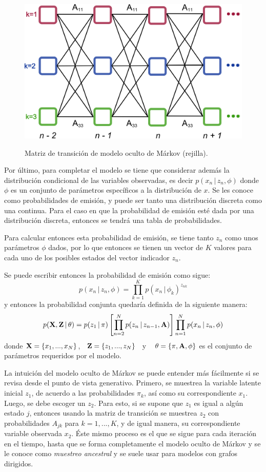 \begin{figure}[hbt]
        \myfloatalign
        {\includegraphics[width=0.63\linewidth]{gfx/chap2/mod-hmm3}}
        \caption{Matriz de transición de modelo oculto de Márkov (rejilla).}
        \label{fig:mod_hmm3}
\end{figure}

Por último, para completar el modelo se tiene que considerar además la distribución condicional de las variables observadas, es decir $p(x_n \,|\, z_n, \phi)$ donde $\phi$ es un conjunto de parámetros específicos a la distribución de $x$. Se les conoce como probabilidades de emisión, y puede ser tanto una distribución discreta como una continua. Para el caso en que la probabilidad de emisión esté dada por una distribución discreta, entonces se tendrá una tabla de probabilidades.

Para calcular entonces esta probabilidad de emisión, se tiene tanto $z_n$ como unos parámetros $\phi$ dados, por lo que entonces se tienen un vector de $K$ valores para cada uno de los posibles estados del vector indicador $z_n$.

Se puede escribir entonces la probabilidad de emisión como sigue:
\begin{equation}
p(x_n \,|\, z_n, \phi) = \prod_{k=1}^K p(x_n \,|\, \phi_k) ^ {z_{nk}}
\label{eqn:2-10}
\end{equation}
y entonces la probabilidad conjunta quedaría definida de la siguiente manera:
\begin{equation}
p(\textbf{X}, \textbf{Z} \,|\, \theta) 
= p(z_1 \,|\, \pi) \left[ \prod_{n=2}^N p(z_n \,|\, z_{n-1}, \textbf{A}) \right]
        \prod_{n=1}^N p(x_n \,|\, z_n, \phi)
\label{eqn:2-11}
\end{equation}
donde $\textbf{X} = \lbrace x_1, ..., x_N \rbrace$,~ $\textbf{Z} = \lbrace z_1, ..., z_N \rbrace$~ y ~ $\theta = \lbrace \pi, \textbf{A}, \phi \rbrace$ es el conjunto de parámetros requeridos por el modelo.

La intuición del modelo oculto de Márkov se puede entender más fácilmente si se revisa desde el punto de vista generativo. Primero, se muestrea la variable latente inicial $z_1$, de acuerdo a las probabilidades $\pi_k$, así como su correspondiente $x_1$. Luego, se debe escoger un $z_2$. Para esto, si se supone que $z_1$ es igual a algún estado $j$, entonces usando la matriz de transición se muestrea $z_2$ con probabilidades $A_{jk}$ para $k = 1, ..., K$, y de igual manera, su correspondiente variable observada $x_2$. Éste mismo proceso es el que se sigue para cada iteración en el tiempo, hasta que se forma completamente el modelo oculto de Márkov y se le conoce como \textit{muestreo ancestral} y se suele usar para modelos con grafos dirigidos.

